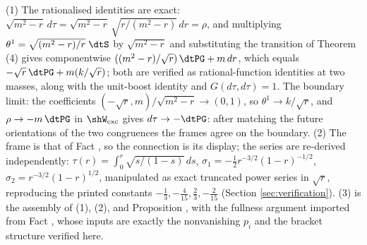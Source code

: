 (1) The rationalised identities are exact: $\sqrt{m^2-r}\,d\tau = \sqrt{m^2-r}\,\sqrt{r/(m^2-r)}\,dr = \rho$, and multiplying $\theta^1 = \sqrt{(m^2-r)/r}\;\dtS$ by $\sqrt{m^2-r}$ and substituting the transition of Theorem (4) gives componentwise $((m^2-r)/\sqrt r)\,\dtPG + m\,dr$, which equals $-\sqrt r\,\dtPG + m(k/\sqrt r)$; both are verified as rational-function identities at two masses, along with the unit-boost identity and $G(d\tau,d\tau) = 1$. The boundary limit: the coefficients $(-\sqrt r, m)/\sqrt{m^2-r} \to (0,1)$, so $\theta^1 \to k/\sqrt r$, and $\rho \to -m\,\dtPG$ in $\shW_{\mathrm{exc}}$ gives $d\tau \to -\dtPG$: after matching the future orientations of the two congruences the frames agree on the boundary. (2) The frame is that of Fact , so the connection is its display; the series are re-derived independently: $\tau(r) = \int_0^r \sqrt{s/(1-s)}\,ds$, $\sigma_1 = -\tfrac12 r^{-3/2}(1-r)^{-1/2}$, $\sigma_2 = r^{-3/2}(1-r)^{1/2}$, manipulated as exact truncated power series in $\sqrt r$, reproducing the printed constants $-\tfrac13, -\tfrac{4}{15}, \tfrac23, -\tfrac{2}{15}$ (Section \ref{sec:verification}). (3) is the assembly of (1), (2), and Proposition , with the fullness argument imported from Fact , whose inputs are exactly the nonvanishing $p_i$ and the bracket structure verified here.
